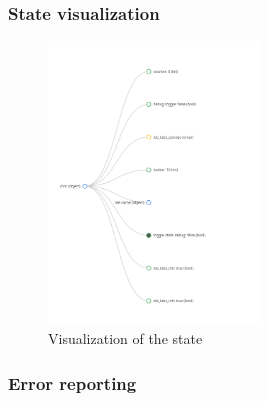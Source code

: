 \begin{frame}
  \frametitle{State visualization}
  \begin{figure}
    \centering
    \includegraphics[width=0.5\textwidth]{./pics/debug-state.png}
    \caption{
      Visualization of the state
    }
  \end{figure}
\end{frame}

\begin{frame}
  \frametitle{Error reporting}
\end{frame}

